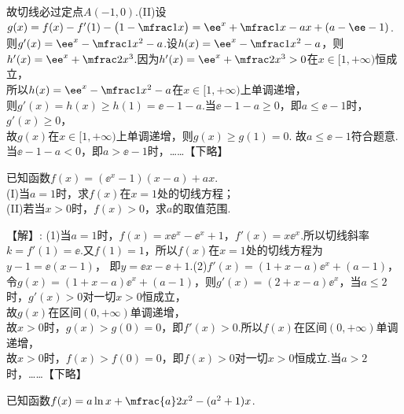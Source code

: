 \begin{exercise}
\begin{answer}
         故切线必过定点$A(-1,0)$.\fz[4]
      (II)设$g(x)=f(x)-f'(1)-\bigl(1-\mfrac1x\bigr)=\ee^x+\mfrac1x-ax+(a-\ee-1)$.\\
         则$g'(x)=\ee^x-\mfrac1{x^2}-a$.\fz[5]
         设$h(x)=\ee^x-\mfrac1{x^2}-a$，则$h'(x)=\ee^x+\mfrac2{x^3}$.\fz[6]
         因为$h'(x)=\ee^x+\mfrac2{x^3}>0$在$x\in[1,+\infty)$恒成立，\\
         所以$h(x)=\ee^x-\mfrac1{x^2}-a$在$x\in[1,+\infty)$上单调递增，\\
         则$g'(x)=h(x)\geqslant h(1)=\ee-1-a$.\fz[8]
         当$\ee-1-a\geqslant0$，即$a\leqslant\ee-1$时，$g'(x)\geqslant0$，\\
         故$g(x)$在$x\in[1,+\infty)$上单调递增，则$g(x)\geqslant g(1)=0$.
         故$a\leqslant\ee-1$符合题意.\fz[10]
         当$\ee-1-a<0$，即$a>\ee-1$时，……【下略】
    \end{answer}
  \vspace{15em}
  \item %
    已知函数$f(x)=(\ee^x-1)(x-a)+ax$.\\
    (I)当$a=1$时，求$f(x)$在$x=1$处的切线方程；\\
    (II)若当$x>0$时，$f(x)>0$，求$a$的取值范围.
    \begin{answer}
      【解】:
      (1)当$a=1$时，$f(x)=x\ee^x-\ee^x+1$，$f'(x)=x\ee^x$.\fz[1]
         所以切线斜率$k=f'(1)=\ee$.\fz[2]
         又$f(1)=1$，所以$f(x)$在$x=1$处的切线方程为$y-1=\ee(x-1)$，
         即$y=\ee x-\ee+1$.\fz[4]
      (2)$f'(x)=(1+x-a)\ee^x+(a-1)$，
         令$g(x)=(1+x-a)\ee^x+(a-1)$，则$g'(x)=(2+x-a)\ee^x$，\fz[5]
         当$a\leqslant2$时，$g'(x)>0$对一切$x>0$恒成立，\\
         故$g(x)$在区间$(0,+\infty)$单调递增，\\
         故$x>0$时，$g(x)>g(0)=0$，即$f'(x)>0$.\fz[7]
         所以$f(x)$在区间$(0,+\infty)$单调递增，\\
         故$x>0$时，$f(x)>f(0)=0$，即$f(x)>0$对一切$x>0$恒成立.\fz[9]
         当$a>2$时，……【下略】
    \end{answer}
  \vspace{15em}
  \item %
    已知函数$f(x)=a\ln x+\mfrac{a}2 x^2-(a^2+1)x$.\\

\end{exercise}

